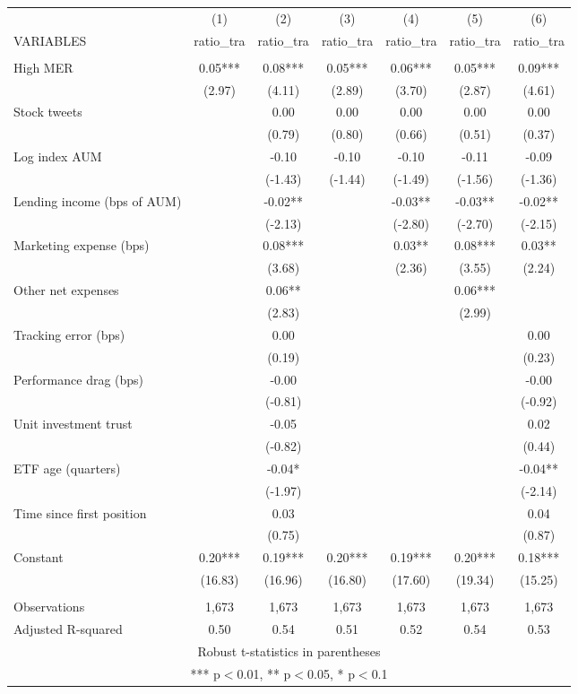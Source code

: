 \documentclass[]{article}
\begin{document}
\begin{tabular}{lcccccc} \hline
 & (1) & (2) & (3) & (4) & (5) & (6) \\
VARIABLES & ratio\_tra & ratio\_tra & ratio\_tra & ratio\_tra & ratio\_tra & ratio\_tra \\ \hline
 &  &  &  &  &  &  \\
High MER & 0.05*** & 0.08*** & 0.05*** & 0.06*** & 0.05*** & 0.09*** \\
 & (2.97) & (4.11) & (2.89) & (3.70) & (2.87) & (4.61) \\
Stock tweets &  & 0.00 & 0.00 & 0.00 & 0.00 & 0.00 \\
 &  & (0.79) & (0.80) & (0.66) & (0.51) & (0.37) \\
Log index AUM &  & -0.10 & -0.10 & -0.10 & -0.11 & -0.09 \\
 &  & (-1.43) & (-1.44) & (-1.49) & (-1.56) & (-1.36) \\
Lending income (bps of AUM) &  & -0.02** &  & -0.03** & -0.03** & -0.02** \\
 &  & (-2.13) &  & (-2.80) & (-2.70) & (-2.15) \\
Marketing expense (bps) &  & 0.08*** &  & 0.03** & 0.08*** & 0.03** \\
 &  & (3.68) &  & (2.36) & (3.55) & (2.24) \\
Other net expenses &  & 0.06** &  &  & 0.06*** &  \\
 &  & (2.83) &  &  & (2.99) &  \\
Tracking error (bps) &  & 0.00 &  &  &  & 0.00 \\
 &  & (0.19) &  &  &  & (0.23) \\
Performance drag (bps) &  & -0.00 &  &  &  & -0.00 \\
 &  & (-0.81) &  &  &  & (-0.92) \\
Unit investment trust &  & -0.05 &  &  &  & 0.02 \\
 &  & (-0.82) &  &  &  & (0.44) \\
ETF age (quarters) &  & -0.04* &  &  &  & -0.04** \\
 &  & (-1.97) &  &  &  & (-2.14) \\
Time since first position &  & 0.03 &  &  &  & 0.04 \\
 &  & (0.75) &  &  &  & (0.87) \\
Constant & 0.20*** & 0.19*** & 0.20*** & 0.19*** & 0.20*** & 0.18*** \\
 & (16.83) & (16.96) & (16.80) & (17.60) & (19.34) & (15.25) \\
 &  &  &  &  &  &  \\
Observations & 1,673 & 1,673 & 1,673 & 1,673 & 1,673 & 1,673 \\
 Adjusted R-squared & 0.50 & 0.54 & 0.51 & 0.52 & 0.54 & 0.53 \\ \hline
\multicolumn{7}{c}{ Robust t-statistics in parentheses} \\
\multicolumn{7}{c}{ *** p$<$0.01, ** p$<$0.05, * p$<$0.1} \\
\end{tabular}
\end{document}
